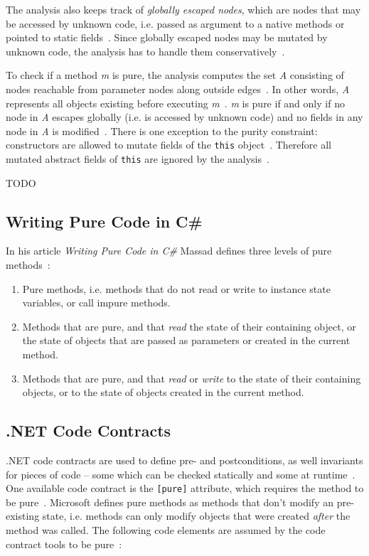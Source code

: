 \documentclass[a4paper,12pt]{article}
\begin{document}

The analysis also keeps track of \textit{globally escaped nodes}, which are nodes that may be accessed by unknown code, i.e. passed as argument to a native methods or pointed to static fields~\cite{salcianu}. Since globally escaped nodes may be mutated by unknown code, the analysis has to handle them conservatively~\cite{salcianu}.

To check if a method \textit{m} is pure, the analysis computes the set \textit{A} consisting of nodes reachable from parameter nodes along outside edges~\cite{salcianu}. In other words, \textit{A} represents all objects existing before executing \textit{m}~\cite{salcianu}. \textit{m} is pure if and only if no node in \textit{A} escapes globally (i.e. is accessed by unknown code) and no fields in any node in \textit{A} is modified~\cite{salcianu}. There is one exception to the purity constraint: constructors are allowed to mutate fields of the \texttt{this} object~\cite{salcianu}. Therefore all mutated abstract fields of \texttt{this} are ignored by the analysis~\cite{salcianu}.

TODO

\subsection{Writing Pure Code in C\#} \label{sub:Writing Pure Code in Cs}
In his article \textit{Writing Pure Code in C\#} Massad defines three levels of pure methods~\cite{yacoub-massad-pure-code}:
\begin{enumerate}
  \item Pure methods, i.e. methods that do not read or write to instance state variables, or call impure methods.
  \item Methods that are pure, and that \textit{read} the state of their containing object, or the state of objects that are passed as parameters or created in the current method.
  \item Methods that are pure, and that \textit{read} or \textit{write} to the state of their containing objects, or to the state of objects created in the current method.
\end{enumerate}

\subsection{.NET Code Contracts} \label{sub:Code contracts} %
.NET code contracts are used to define pre- and postconditions, as well invariants for pieces of code -- some which can be checked statically and some at runtime~\cite{microsoft-code-contracts}. One available code contract is the \texttt{[pure]} attribute, which requires the method to be pure~\cite{microsoft-code-contracts}. Microsoft defines pure methods as methods that don't modify an pre-existing state, i.e. methods can only modify objects that were created \textit{after} the method was called. The following code elements are assumed by the code contract tools to be pure~\cite{microsoft-code-contracts}:
\end{document}
